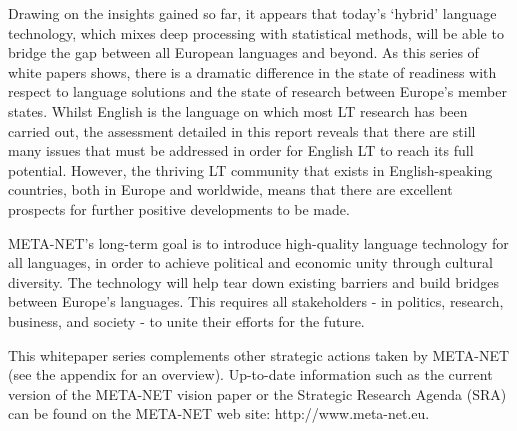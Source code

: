 \documentclass[]{../../metanetpaper}
\begin{document}
\begin{multicols}{2}

Drawing on the insights gained so far, it appears that today's `hybrid' language technology, which mixes deep processing with statistical methods, will be able to bridge the gap between all European languages and beyond. As this series of white papers shows, there is a dramatic difference in the state of readiness with respect to language solutions and the state of research between Europe's member states. Whilst English is the language on which most LT research has been carried out, the assessment detailed in this report reveals that there are still many issues that must be addressed in order for English LT to reach its full potential. However, the thriving LT community that exists in English-speaking countries, both in Europe and worldwide, means that there are excellent prospects for further positive developments to be made. 

META-NET's long-term goal is to introduce high-quality language technology for all languages, in order to achieve political and economic unity through cultural diversity. The technology will help tear down existing barriers and build bridges between Europe's languages. This requires all stakeholders - in politics, research, business, and society - to unite their efforts for the future.

This whitepaper series complements other strategic actions taken by META-NET (see the appendix for an overview). Up-to-date information such as the current version of the META-NET vision paper \cite{Meta1} or the Strategic Research Agenda (SRA) can be found on the META-NET web site: http://www.meta-net.eu.
\end{multicols}

\clearpage

\end{document}
